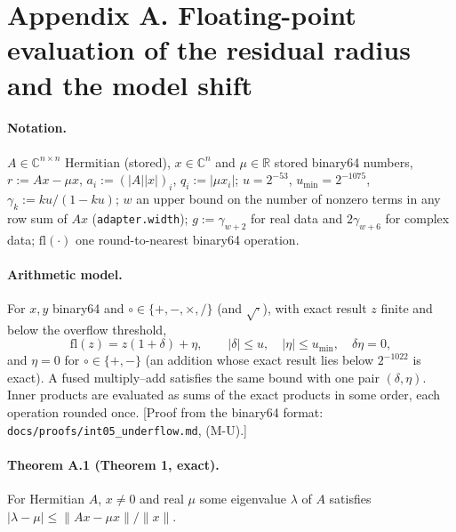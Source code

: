 
\section*{Appendix A. Floating-point evaluation of the residual radius and the model shift}

\paragraph{Notation.}
$A\in\mathbb{C}^{n\times n}$ Hermitian (stored), $x\in\mathbb{C}^n$ and $\mu\in\mathbb{R}$ stored binary64 numbers,
$r := Ax-\mu x$, $a_i := (|A||x|)_i$, $q_i := |\mu x_i|$; $u = 2^{-53}$, $u_{\min} = 2^{-1075}$,
$\gamma_k := ku/(1-ku)$; $w$ an upper bound on the number of nonzero terms in any row sum of $Ax$
(\texttt{adapter.width}); $g := \gamma_{w+2}$ for real data and $2\gamma_{w+6}$ for complex data;
$\mathrm{fl}(\cdot)$ one round-to-nearest binary64 operation.

\paragraph{Arithmetic model.}
For $x,y$ binary64 and $\circ\in\{+,-,\times,/\}$ (and $\sqrt{\cdot}$), with exact result $z$ finite and below the
overflow threshold,
\[
\mathrm{fl}(z) = z(1+\delta)+\eta,\qquad |\delta|\le u,\quad |\eta|\le u_{\min},\quad \delta\eta = 0,
\]
and $\eta=0$ for $\circ\in\{+,-\}$ (an addition whose exact result lies below $2^{-1022}$ is exact).
A fused multiply--add satisfies the same bound with one pair $(\delta,\eta)$. Inner products are evaluated as
sums of the exact products in some order, each operation rounded once.
[Proof from the binary64 format: \texttt{docs/proofs/int05\_underflow.md}, (M-U).]

\paragraph{Theorem A.1 (Theorem 1, exact).}
For Hermitian $A$, $x\ne 0$ and real $\mu$ some eigenvalue $\lambda$ of $A$ satisfies
$|\lambda-\mu|\le \|Ax-\mu x\|/\|x\|$.

